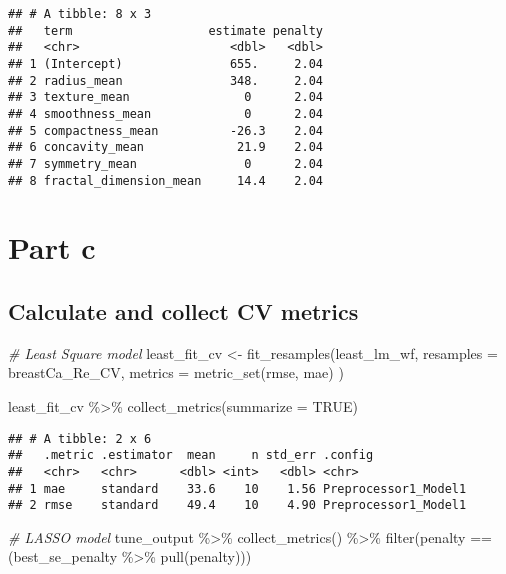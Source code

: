 \documentclass[
]{article}
\newenvironment{Shaded}{\begin{snugshade}}{\end{snugshade}}
\newcommand{\AttributeTok}[1]{\textcolor[rgb]{0.77,0.63,0.00}{#1}}
\newcommand{\CommentTok}[1]{\textcolor[rgb]{0.56,0.35,0.01}{\textit{#1}}}
\newcommand{\ConstantTok}[1]{\textcolor[rgb]{0.00,0.00,0.00}{#1}}
\newcommand{\FunctionTok}[1]{\textcolor[rgb]{0.00,0.00,0.00}{#1}}
\newcommand{\NormalTok}[1]{#1}
\newcommand{\OtherTok}[1]{\textcolor[rgb]{0.56,0.35,0.01}{#1}}
\newcommand{\SpecialCharTok}[1]{\textcolor[rgb]{0.00,0.00,0.00}{#1}}
\begin{document}
\begin{verbatim}
## # A tibble: 8 x 3
##   term                   estimate penalty
##   <chr>                     <dbl>   <dbl>
## 1 (Intercept)               655.     2.04
## 2 radius_mean               348.     2.04
## 3 texture_mean                0      2.04
## 4 smoothness_mean             0      2.04
## 5 compactness_mean          -26.3    2.04
## 6 concavity_mean             21.9    2.04
## 7 symmetry_mean               0      2.04
## 8 fractal_dimension_mean     14.4    2.04
\end{verbatim}

\hypertarget{part-c}{%
\section{Part c}\label{part-c}}

\hypertarget{calculate-and-collect-cv-metrics}{%
\subsection{Calculate and collect CV
metrics}\label{calculate-and-collect-cv-metrics}}

\begin{Shaded}
\begin{Highlighting}[]
\CommentTok{\# Least Square model}
\NormalTok{least\_fit\_cv }\OtherTok{\textless{}{-}} \FunctionTok{fit\_resamples}\NormalTok{(least\_lm\_wf,}
  \AttributeTok{resamples =}\NormalTok{ breastCa\_Re\_CV, }
  \AttributeTok{metrics =} \FunctionTok{metric\_set}\NormalTok{(rmse, mae)}
\NormalTok{)}

\NormalTok{least\_fit\_cv }\SpecialCharTok{\%\textgreater{}\%} \FunctionTok{collect\_metrics}\NormalTok{(}\AttributeTok{summarize =} \ConstantTok{TRUE}\NormalTok{)}
\end{Highlighting}
\end{Shaded}

\begin{verbatim}
## # A tibble: 2 x 6
##   .metric .estimator  mean     n std_err .config             
##   <chr>   <chr>      <dbl> <int>   <dbl> <chr>               
## 1 mae     standard    33.6    10    1.56 Preprocessor1_Model1
## 2 rmse    standard    49.4    10    4.90 Preprocessor1_Model1
\end{verbatim}

\begin{Shaded}
\begin{Highlighting}[]
\CommentTok{\# LASSO model}
\NormalTok{tune\_output }\SpecialCharTok{\%\textgreater{}\%} 
  \FunctionTok{collect\_metrics}\NormalTok{() }\SpecialCharTok{\%\textgreater{}\%} 
  \FunctionTok{filter}\NormalTok{(penalty }\SpecialCharTok{==}\NormalTok{ (best\_se\_penalty }
                     \SpecialCharTok{\%\textgreater{}\%} \FunctionTok{pull}\NormalTok{(penalty)))}
\end{Highlighting}
\end{Shaded}
\end{document}

